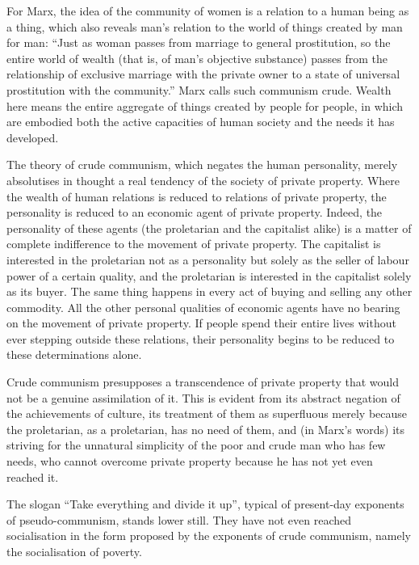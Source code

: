 \documentclass[../main]{subfiles}
\begin{document}
For Marx, the idea of the community of women is a relation to a human being as a thing, which also reveals man’s relation to the world of things created by man for man: “Just as woman passes from marriage to general prostitution, so the entire world of wealth (that is, of man’s objective substance) passes from the relationship of exclusive marriage with the private owner to a state of universal prostitution with the community.” Marx calls such communism crude. Wealth here means the entire aggregate of things created by people for people, in which are embodied both the active capacities of human society and the needs it has developed.

The theory of crude communism, which negates the human personality, merely absolutises in thought a real tendency of the society of private property. Where the wealth of human relations is reduced to relations of private property, the personality is reduced to an economic agent of private property. Indeed, the personality of these agents (the proletarian and the capitalist alike) is a matter of complete indifference to the movement of private property. The capitalist is interested in the proletarian not as a personality but solely as the seller of labour power of a certain quality, and the proletarian is interested in the capitalist solely as its buyer. The same thing happens in every act of buying and selling any other commodity. All the other personal qualities of economic agents have no bearing on the movement of private property. If people spend their entire lives without ever stepping outside these relations, their personality begins to be reduced to these determinations alone.

Crude communism presupposes a transcendence of private property that would not be a genuine assimilation of it. This is evident from its abstract negation of the achievements of culture, its treatment of them as superfluous merely because the proletarian, as a proletarian, has no need of them, and (in Marx’s words) its striving for the unnatural simplicity of the poor and crude man who has few needs, who cannot overcome private property because he has not yet even reached it.

The slogan “Take everything and divide it up”, typical of present-day exponents of pseudo-communism, stands lower still. They have not even reached socialisation in the form proposed by the exponents of crude communism, namely the socialisation of poverty.
\end{document}
